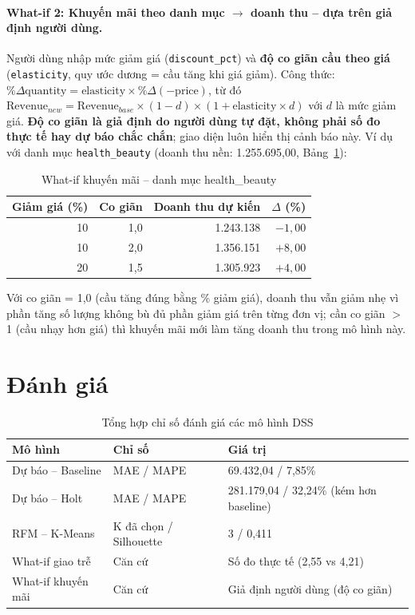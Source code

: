 \documentclass[12pt,a4paper]{article}
\newcommand{\code}[1]{\texttt{\small #1}}
\begin{document}
\paragraph{What-if 2: Khuyến mãi theo danh mục \(\to\) doanh thu -- dựa trên giả định người dùng.}
Người dùng nhập mức giảm giá (\code{discount\_pct}) và \textbf{độ co giãn cầu theo giá}
(\code{elasticity}, quy ước dương = cầu tăng khi giá giảm). Công thức:
\(\%\Delta\text{quantity} = \text{elasticity} \times \%\Delta(-\text{price})\), từ đó
\(\text{Revenue}_{new} = \text{Revenue}_{base} \times (1-d) \times (1 + \text{elasticity} \times d)\) với
\(d\) là mức giảm giá. \textbf{Độ co giãn là giả định do người dùng tự đặt, không phải số đo thực tế hay dự
báo chắc chắn}; giao diện luôn hiển thị cảnh báo này. Ví dụ với danh mục \code{health\_beauty}
(doanh thu nền: 1.255.695,00, Bảng~\ref{tab:whatif-promo}):

\begin{table}[h]
\centering
\caption{What-if khuyến mãi -- danh mục health\_beauty}\label{tab:whatif-promo}
\small
\begin{tabular}{@{}r r r r@{}}
\toprule
\textbf{Giảm giá (\%)} & \textbf{Co giãn} & \textbf{Doanh thu dự kiến} & \textbf{\(\Delta\) (\%)}\\
\midrule
10 & 1,0 & 1.243.138 & $-1,00$\\
10 & 2,0 & 1.356.151 & $+8,00$\\
20 & 1,5 & 1.305.923 & $+4,00$\\
\bottomrule
\end{tabular}
\end{table}

Với co giãn = 1,0 (cầu tăng đúng bằng \% giảm giá), doanh thu vẫn giảm nhẹ vì phần tăng số lượng không bù đủ
phần giảm giá trên từng đơn vị; cần co giãn \(>\) 1 (cầu nhạy hơn giá) thì khuyến mãi mới làm tăng doanh thu
trong mô hình này.

\section{Đánh giá}

\begin{table}[h]
\centering
\caption{Tổng hợp chỉ số đánh giá các mô hình DSS}\label{tab:eval-summary}
\small
\begin{tabularx}{\textwidth}{@{}l l X@{}}
\toprule
\textbf{Mô hình} & \textbf{Chỉ số} & \textbf{Giá trị}\\
\midrule
Dự báo -- Baseline & MAE / MAPE & 69.432,04 / 7,85\%\\
Dự báo -- Holt & MAE / MAPE & 281.179,04 / 32,24\% (kém hơn baseline)\\
RFM -- K-Means & K đã chọn / Silhouette & 3 / 0,411\\
What-if giao trễ & Căn cứ & Số đo thực tế (2,55 vs 4,21)\\
What-if khuyến mãi & Căn cứ & Giả định người dùng (độ co giãn)\\
\bottomrule
\end{tabularx}
\end{table}
\end{document}
